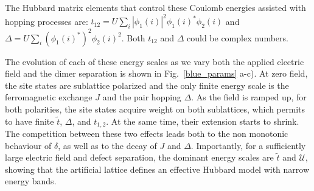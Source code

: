 The Hubbard matrix elements that control these Coulomb energies assisted with hopping processes are: 
$t_{12}= U \sum_i |\phi_{1}(i)|^2 \phi_1(i)^* \phi_{2}(i)$
and
$\Delta= U \sum_i (\phi_{1}(i)^*)^2 \phi_2(i)^2$.
Both $t_{12}$ and $\Delta$ could be complex numbers.

The evolution of each of these energy scales as we vary both the applied electric field and the dimer separation is shown in Fig.~\ref{blue_params} a-c). At zero field, the site states are sublattice polarized and the only finite energy scale is the ferromagnetic exchange $J$ and the pair hopping $\Delta$. As the field is ramped up, for both polarities, the site states acquire weight on both sublattices, which permits to have finite $\tilde{t}$, $\Delta$, and $t_{1,2}$. At the same time, their extension starts to shrink. The competition between these two effects leads both to the non monotonic behaviour of $\delta$, as well as to the decay of $J$ and $\Delta$. Importantly, for a sufficiently large electric field and defect separation, the dominant energy scales are $\tilde{t}$ and $\mathcal{U}$, showing that the artificial lattice defines an effective Hubbard model with narrow energy bands. 

